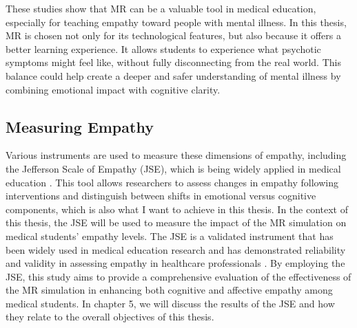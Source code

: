 These studies show that MR can be a valuable tool in medical education, especially for teaching empathy toward people with mental illness. In this thesis, MR is chosen not only for its technological features, but also because it offers a better learning experience. It allows students to experience what psychotic symptoms might feel like, without fully disconnecting from the real world. This balance could help create a deeper and safer understanding of mental illness by combining emotional impact with cognitive clarity.

\subsection{Measuring Empathy}
Various instruments are used to measure these dimensions of empathy, including the Jefferson Scale of Empathy (JSE), which is being widely applied in medical education \cite{Alieldin2024}. This tool allows researchers to assess changes in empathy following interventions and distinguish between shifts in emotional versus cognitive components, which is also what I want to achieve in this thesis. In the context of this thesis, the JSE will be used to measure the impact of the MR simulation on medical students' empathy levels. The JSE is a validated instrument that has been widely used in medical education research and has demonstrated reliability and validity in assessing empathy in healthcare professionals \cite{Hojat2002}. By employing the JSE, this study aims to provide a comprehensive evaluation of the effectiveness of the MR simulation in enhancing both cognitive and affective empathy among medical students. In chapter 5, we will discuss the results of the JSE and how they relate to the overall objectives of this thesis.
